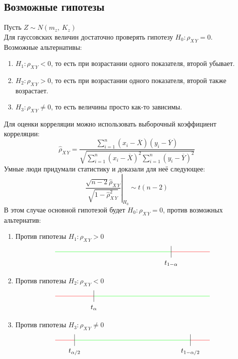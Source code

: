 \documentclass[12pt, a4paper]{article}
\begin{document}
\subsection*{Возможные гипотезы}
Пусть $Z \sim N(m_z,\ K_z)$\\
Для гауссовских величин достаточно проверять гипотезу $H_0: \rho_{X\, Y} = 0$.\\
Возможные альтернативы:
\begin{enumerate}
    \item $H_1: \rho_{X\, Y} < 0$, то есть при возрастании одного показателя, второй убывает.
    \item $H_2: \rho_{X\, Y} > 0$, то есть при возрастании одного показателя, второй также возрастает.
    \item $H_3: \rho_{X\, Y} \neq 0$, то есть величины просто как-то зависимы.
\end{enumerate}
Для оценки корреляции можно использовать выборочный коэффициент корреляции:
\[
\hat \rho_{X\, Y} = \frac{ \sum_{i =  1}^{n} \left( x_i - \overline{X} \right) \left( y_i - \overline{Y} \right) }{ \sqrt{ \sum_{i = 1}^{n} {\left( x_i - \overline{X} \right)}^2 \sum_{i = 1}^{n} {\left( y_i - \overline{Y} \right)}^2 } }
\]
Умные люди придумали статистику и доказали для неё следующее:
\[
\left. \frac{\sqrt{n - 2} \hat \rho_{X\, Y}}{\sqrt{1 - \hat \rho^2_{X\, Y}}} \right|_{H_0} \sim t(n - 2)
\]
В этом случае основной гипотезой будет $H_0: \rho_{X\, Y} = 0$, против возможных альтернатив:
\begin{enumerate}
    \item Против гипотезы $H_1: \rho_{X\, Y} > 0$
\[\begin{tikzpicture}[scale = 2]
    \draw[color=green] (-2, 0) -- (1, 0);
    \draw[color=red] (1, 0) -- (2, 0);
    \draw (1, 0.15) -- (1, -0.15);
    \node at (1, -0.3) (a) {$t_{1 - \alpha}$};
\end{tikzpicture}\]
    \item Против гипотезы $H_2: \rho_{X\, Y} < 0$
\[\begin{tikzpicture}[scale = 2]
    \draw[color=green] (-1, 0) -- (2, 0);
    \draw[color=red] (-2, 0) -- (-1, 0);
    \draw (-1, -0.15) -- (-1, 0.15);
    \node at (-1, -0.3) (a) {$t_{\alpha}$};
\end{tikzpicture}\]
    \item Против гипотезы $H_3: \rho_{X\, Y} \neq 0$
\[
\begin{tikzpicture}[scale = 2]
    \draw[color=red] (-2, 0) -- (-1.5, 0);
    \draw[color=red] (1.5, 0) -- (2, 0);
    \draw[color=green] (-1.5, 0) -- (1.5, 0);
    \draw (1.5, -0.15) -- (1.5, 0.15);
    \draw (-1.5, -0.15) -- (-1.5, 0.15);
    \node at(-1.5, -0.3) (a) {$t_{\alpha/2}$};
    \node at(1.5, -0.3) (a) {$t_{1 - \alpha/2}$};
\end{tikzpicture}
\]
\end{enumerate}
\end{document}
